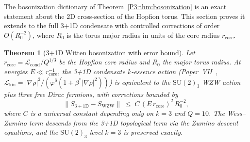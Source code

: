 \documentclass[11pt,a4paper]{article}
\newtheorem{theorem}{Theorem}[section]
\theoremstyle{definition}
\theoremstyle{remark}
\newcommand{\vp}{\varphi}
\newcommand{\bst}{\beta^{*}}
\begin{document}
The bosonization dictionary of Theorem~\ref{P3:thm:bosonization} is an exact
statement about the 2D cross-section of the Hopfion torus.
This section proves it extends to the full 3+1D condensate with
controlled corrections of order $O(R_0^{-2})$, where $R_0$ is the torus
major radius in units of the core radius $r_{\mathrm{core}}$.

\begin{theorem}[3+1D Witten bosonization with error bound]
\label{P3:thm:bos_3d}
Let $r_{\mathrm{core}} = \mathcal{L}_{\mathrm{cond}}/Q^{1/3}$ be the
Hopfion core radius and $R_0$ the major torus radius.
At energies $E \ll r_{\mathrm{core}}^{-1}$, the 3+1D condensate
$k$-essence action (Paper~VII~\cite{Paper7},
$\mathcal{L}_\mathrm{kin} = |\nabla\rho|^2/(\vp^6(1+\bst|\nabla\rho|^2))$) is equivalent to the
$\mathrm{SU}(2)_3$ WZW action plus three free Dirac fermions,
with corrections bounded by
\begin{equation}
  \bigl\|S_{3+1\mathrm{D}} - S_{\mathrm{WZW}}\bigr\|
  \;\leq\; C\,(E\,r_{\mathrm{core}})^2\,R_0^{-2},
  \label{P3:eq:bos_bound}
\end{equation}
where $C$ is a universal constant depending only on $k=3$ and $Q=10$.
The Wess--Zumino term descends from the 3+1D topological term via the
Zumino descent equations, and the $\mathrm{SU}(2)_3$ level $k=3$ is
preserved exactly.
\end{theorem}
\end{document}
